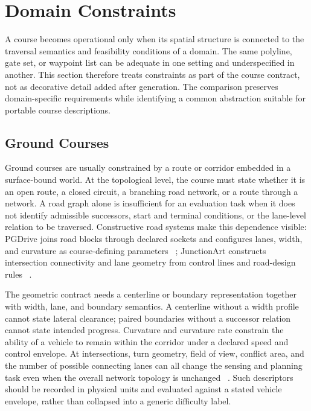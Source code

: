 \section{Domain Constraints}
\label{sec:domain-constraints}

A course becomes operational only when its spatial structure is connected to
the traversal semantics and feasibility conditions of a domain.  The same
polyline, gate set, or waypoint list can be adequate in one setting and
underspecified in another.  This section therefore treats constraints as part of
the course contract, not as decorative detail added after generation.  The
comparison preserves domain-specific requirements while identifying a common
abstraction suitable for portable course descriptions.

\subsection{Ground Courses}

Ground courses are usually constrained by a route or corridor embedded in a
surface-bound world.  At the topological level, the course must state whether it
is an open route, a closed circuit, a branching road network, or a route through
a network.  A road graph alone is insufficient for an evaluation task when it
does not identify admissible successors, start and terminal conditions, or the
lane-level relation to be traversed.  Constructive road systems make this
dependence visible: PGDrive joins road blocks through declared sockets and
configures lanes, width, and curvature as course-defining parameters
~\cite{Li2020ImprovingGeneralization}; JunctionArt constructs intersection
connectivity and lane geometry from control lines and road-design rules
~\cite{Muktadir2023ProceduralGeneration}.

The geometric contract needs a centerline or boundary representation together
with width, lane, and boundary semantics.  A centerline without a width profile
cannot state lateral clearance; paired boundaries without a successor relation
cannot state intended progress.  Curvature and curvature rate constrain the
ability of a vehicle to remain within the corridor under a declared speed and
control envelope.  At intersections, turn geometry, field of view, conflict
area, and the number of possible connecting lanes can all change the sensing and
planning task even when the overall network topology is unchanged
~\cite{Muktadir2023ProceduralGeneration}.  Such descriptors should be recorded
in physical units and evaluated against a stated vehicle envelope, rather than
collapsed into a generic difficulty label.

